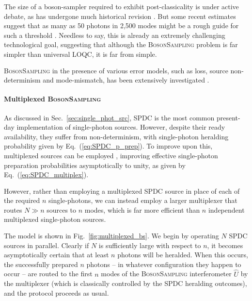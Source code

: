The size of a boson-sampler required to exhibit post-classicality is under active debate, as has undergone much historical revision \cite{RohdeRalph}. But some recent estimates suggest that as many as 50 photons in 2,500 modes might be a rough guide for such a threshold \cite{NoSupBS_Montanaro}. Needless to say, this is already an extremely challenging technological goal, suggesting that although the \textsc{BosonSampling} problem is far simpler than universal LOQC, it is far from simple.

\textsc{BosonSampling} in the presence of various error models, such as loss, source non-determinism and mode-mismatch, has been extensively investigated \cite{bib:RohdeErrBS12, bib:RohdeSPDC13, bib:ScottLost16, bib:RohdeArbSpec15, bib:RandBS}. 

%
%

\paragraph{Multiplexed \textsc{BosonSampling}} 

As discussed in Sec.~\ref{sec:single_phot_src}, SPDC is the most common present-day implementation of single-photon sources. However, despite their ready availability, they suffer from non-determinism, with single-photon heralding probability given by Eq.~(\ref{eq:SPDC_p_prep}). To improve upon this, multiplexed sources can be employed \cite{bib:RohdeSPDC13}, improving effective single-photon preparation probabilities asymptotically to unity, as given by Eq.~(\ref{eq:SPDC_multiplex}).

However, rather than employing a multiplexed SPDC source in place of each of the required $n$ single-photons, we can instead employ a larger multiplexer that routes \mbox{$N\gg n$} sources to $n$ modes, which is far more efficient than $n$ independent multiplexed single-photon sources.

The model is shown in Fig.~\ref{fig:multiplexed_bs}. We begin by operating $N$ SPDC sources in parallel. Clearly if $N$ is sufficiently large with respect to $n$, it becomes asymptotically certain that at least $n$ photons will be heralded. When this occurs, the successfully prepared $n$ photons -- in whatever configuration they happen to occur -- are routed to the first $n$ modes of the \textsc{BosonSampling} interferometer $\hat{U}$ by the multiplexer (which is classically controlled by the SPDC heralding outcomes), and the protocol proceeds as usual.

